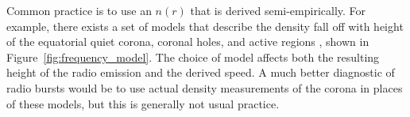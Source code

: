 Common practice is to use an $n(r)$ that is derived semi-empirically. For example, there exists a set of models that describe the density fall off with height of the equatorial quiet corona, coronal holes, and active regions \citet{allen1947, newkirk1961, saito1977}, shown in Figure~\ref{fig:frequency_model}. The choice of model affects both the resulting height of the radio emission and the derived speed. A much better diagnostic of radio bursts would be to use actual density measurements of the corona in places of these models, but this is generally not usual practice.














